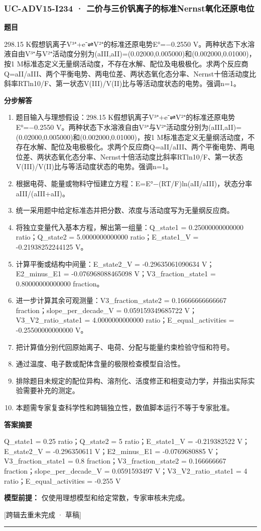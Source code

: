 \documentclass[UTF8,11pt,a4paper]{ctexart}
\begin{document}
\subsubsection*{UC-ADV15-I234 · 二价与三价钒离子的标准Nernst氧化还原电位}
\noindent\textbf{题目}\par
298.15 K假想钒离子V³⁺+e⁻⇌V²⁺的标准还原电势E°=−0.2550 V。两种状态下水溶液自由V³⁺与V²⁺活动度分别为(aIII,aII)=(0.02000,0.005000)和(0.002000,0.01000)，按1 M标准态定义无量纲活动度，不存在水解、配位及电极极化。求两个反应商Q=aII/aIII、两个平衡电势、两电位差、两状态氧化态分率、Nernst十倍活动度比斜率RTln10/F、第一状态V(III)/V(II)比与等活动度状态的电势。强调n=1。\par
\medskip\noindent\textbf{分步解答}
\begin{enumerate}
\item 题目输入与理想假设：298.15 K假想钒离子V³⁺+e⁻⇌V²⁺的标准还原电势E°=−0.2550 V。两种状态下水溶液自由V³⁺与V²⁺活动度分别为(aIII,aII)=(0.02000,0.005000)和(0.002000,0.01000)，按1 M标准态定义无量纲活动度，不存在水解、配位及电极极化。求两个反应商Q=aII/aIII、两个平衡电势、两电位差、两状态氧化态分率、Nernst十倍活动度比斜率RTln10/F、第一状态V(III)/V(II)比与等活动度状态的电势。强调n=1。
\item 根据电荷、能量或物料守恒建立方程：E=E°−(RT/F)ln(aII/aIII)，状态分率aIII/(aIII+aII)。
\item 统一采用题中给定标准态并把分数、浓度与活动度写为无量纲反应商。
\item 将独立变量代入基本方程，解出第一组量：Q\_state1 = 0.25000000000000 ratio；Q\_state2 = 5.0000000000000 ratio；E\_state1\_V = -0.21938252244125 V。
\item 计算平衡或结构中间量：E\_state2\_V = -0.29635061090634 V；E2\_minus\_E1 = -0.076968088465098 V；V3\_fraction\_state1 = 0.80000000000000 fraction。
\item 进一步计算其余可观测量：V3\_fraction\_state2 = 0.16666666666667 fraction；slope\_per\_decade\_V = 0.059159349685722 V；V3\_V2\_ratio\_state1 = 4.0000000000000 ratio；E\_equal\_activities = -0.25500000000000 V。
\item 把计算值分别代回原始离子、电荷、分配与能量约束检验守恒和符号。
\item 通过温度、电子数或配体含量的极限检查模型自洽性。
\item 排除题目未规定的配位异构、溶剂化、活度修正和相变动力学，并指出实际实验需要补充的测定。
\item 本题需专家复查科学性和跨辑独立性，数值脚本运行不等于专家批准。
\end{enumerate}
\noindent\textbf{答案摘要}\par
Q\_state1 = 0.25 ratio；Q\_state2 = 5 ratio；E\_state1\_V = -0.219382522 V；E\_state2\_V = -0.296350611 V；E2\_minus\_E1 = -0.0769680885 V；V3\_fraction\_state1 = 0.8 fraction；V3\_fraction\_state2 = 0.166666667 fraction；slope\_per\_decade\_V = 0.0591593497 V；V3\_V2\_ratio\_state1 = 4 ratio；E\_equal\_activities = -0.255 V\par
\noindent\textbf{模型前提：}
仅使用理想模型和给定常数，专家审核未完成。\par
\noindent\textcolor{red!65!black}{[跨辑去重未完成 · 草稿]} \par
\medskip\hrule\medskip
{}
\end{document}
